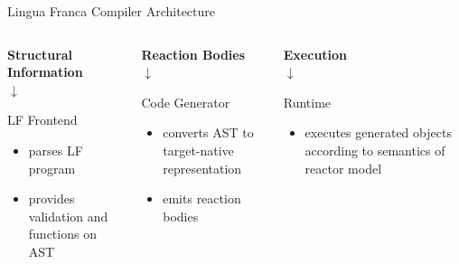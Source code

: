 \documentclass[aspectratio=169]{beamer}
\begin{document}
\begin{frame}{Lingua Franca Compiler Architecture}
\begin{columns}[t, onlytextwidth]

\begin{column}{0.32\textwidth}
{
\begin{center}
\textbf{Structural Information} \\
\vspace{2mm}
$\downarrow$
\end{center}
\begin{block}{LF Frontend}
  \begin{itemize}
    \item parses LF program
    \item provides validation and functions on AST
  \end{itemize}
\end{block}
}
\end{column}

\pause

\begin{column}{0.32\textwidth}
{
\begin{center}
\textbf{Reaction Bodies} \\
\vspace{2mm}
$\downarrow$
\end{center}
\begin{block}{Code Generator}
  \begin{itemize}
    \item converts AST to target-native representation
    \item emits reaction bodies
  \end{itemize}
\end{block}
}
\end{column}

\pause

\begin{column}{0.32\textwidth}
\begin{center}
\textbf{Execution} \\
\vspace{2mm}
$\downarrow$
\end{center}
\begin{block}{Runtime}
  \begin{itemize}
    \item executes generated objects according to semantics of reactor model
  \end{itemize}
\end{block}
\end{column}

\end{columns}
\end{frame}
\end{document}

